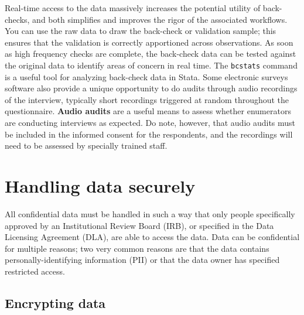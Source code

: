 Real-time access to the data massively increases the potential utility of back-checks,
and both simplifies and improves the rigor of the associated workflows.
You can use the raw data to draw the back-check or validation sample;
this ensures that the validation is correctly apportioned across observations.
As soon as high frequency checks are complete,
the back-check data can be tested against
the original data to identify areas of concern in real time.
The \texttt{bcstats} command is a useful tool for analyzing back-check data in Stata.
Some electronic surveys software also provide a unique opportunity
to do audits through audio recordings of the interview,
typically short recordings triggered at random throughout the questionnaire.
\textbf{Audio audits}
are a useful means to assess whether enumerators are conducting interviews as expected.
Do note, however, that audio audits must be included in the informed consent for the respondents,
and the recordings will need to be assessed by specially trained staff.



\section{Handling data securely}

All confidential data must be handled in such a way that only people specifically
approved by an Institutional Review Board (IRB),
or specified in the Data Licensing Agreement (DLA),
are able to access the data.
Data can be confidential for multiple reasons;
two very common reasons are that the data contains
personally-identifying information (PII)
or that the data owner has specified restricted access.

\subsection{Encrypting data}

